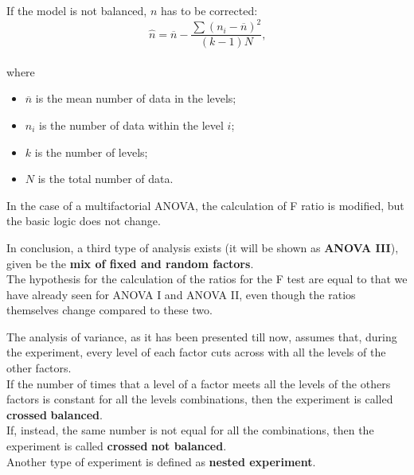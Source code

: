 \begin{frame}
  If the model is not balanced, ${n}$ has to be corrected:\\
  $$ \hat{n}=\overline{n}-\frac{\sum{({n}_{i}-\overline{n})^2}}{(k-1)N} \mbox{,} $$\\
  where
  \begin{itemize}
    \item $\overline{n}$ is the mean number of data in the levels; 
    \item ${n}_{i}$ is the number of data within the level $i$;
    \item ${k}$ is the number of levels;
    \item ${N}$ is the total number of data.
  \end{itemize}
  \vspace{.50cm}
  In the case of a multifactorial ANOVA, the calculation of F ratio is modified, but the basic logic does not change.
\end{frame}

\begin{frame}
  \vspace*{.75cm}
  In conclusion, a third type of analysis exists (it will be shown as \textbf{ANOVA III}), given be the \textbf{mix of fixed and random factors}.\\
  \vspace* {.75cm}
  The hypothesis for the calculation of the ratios for the F test are equal to that we have already seen for ANOVA I and ANOVA II, even though the ratios themselves change compared to these two.
\end{frame}


\begin{frame}
  \vspace*{.25cm} 
  The analysis of variance, as it has been presented till now, assumes that, during the experiment, every level of each factor cuts across with all the levels of the other factors.\\
  \vspace*{.5cm} 
  If the number of times that a level of a factor meets all the levels of the others factors is constant for all the levels combinations, then the experiment is called \textbf{crossed} \textbf{balanced}.\\
  \vspace*{.5cm} 
  If, instead, the same number is not equal for all the combinations, then the experiment is called \textbf{crossed} \textbf{not balanced}.\\
  \vspace*{.5cm} 
  Another type of experiment is defined as \textbf{nested experiment}.
\end{frame}

